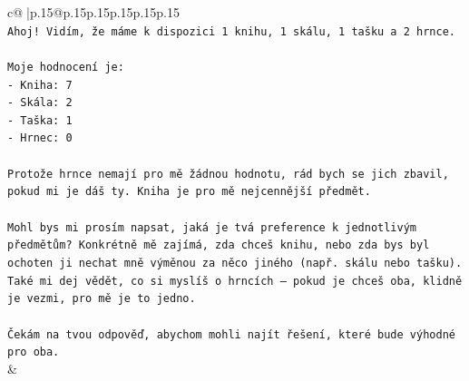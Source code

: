 \documentclass{article}
\begin{document}
{\begin{supertabular}{c@{$\;$}|p{.15\linewidth}@{}p{.15\linewidth}p{.15\linewidth}p{.15\linewidth}p{.15\linewidth}p{.15\linewidth}}
{{{\\ 
\texttt{Ahoj! Vidím, že máme k dispozici 1 knihu, 1 skálu, 1 tašku a 2 hrnce.} \\
\\ 
\texttt{Moje hodnocení je:} \\
\texttt{{-} Kniha: 7} \\
\texttt{{-} Skála: 2} \\
\texttt{{-} Taška: 1} \\
\texttt{{-} Hrnec: 0} \\
\\ 
\texttt{Protože hrnce nemají pro mě žádnou hodnotu, rád bych se jich zbavil, pokud mi je dáš ty. Kniha je pro mě nejcennější předmět.} \\
\\ 
\texttt{Mohl bys mi prosím napsat, jaká je tvá preference k jednotlivým předmětům? Konkrétně mě zajímá, zda chceš knihu, nebo zda bys byl ochoten ji nechat mně výměnou za něco jiného (např. skálu nebo tašku). Také mi dej vědět, co si myslíš o hrncích – pokud je chceš oba, klidně je vezmi, pro mě je to jedno.} \\
\\ 
\texttt{Čekám na tvou odpověď, abychom mohli najít řešení, které bude výhodné pro oba.} \\
            }
        }
    }
    & \\ \\


\end{supertabular}}
\end{document}
